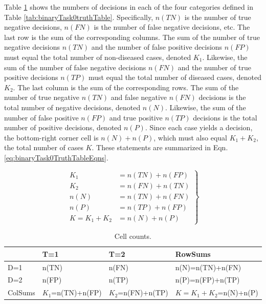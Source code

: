 \documentclass[
]{book}
\begin{document}
Table \ref{tab:binaryTask0truthTable2} shows the numbers of decisions in each of the four categories defined in Table \ref{tab:binaryTask0truthTable}. Specifically, \(n(TN)\) is the number of true negative decisions, \(n(FN)\) is the number of false negative decisions, etc. The last row is the sum of the corresponding columns. The sum of the number of true negative decisions \(n(TN)\) and the number of false positive decisions \(n(FP)\) must equal the total number of non-diseased cases, denoted \(K_1\). Likewise, the sum of the number of false negative decisions \(n(FN)\) and the number of true positive decisions \(n(TP)\) must equal the total number of diseased cases, denoted \(K_2\). The last column is the sum of the corresponding rows. The sum of the number of true negative \(n(TN)\) and false negative \(n(FN)\) decisions is the total number of negative decisions, denoted \(n(N)\). Likewise, the sum of the number of false positive \(n(FP)\) and true positive \(n(TP)\) decisions is the total number of positive decisions, denoted \(n(P)\). Since each case yields a decision, the bottom-right corner cell is \(n(N) + n(P)\), which must also equal \(K_1+K_2\), the total number of cases \(K\). These statements are summarized in Eqn. \eqref{eq:binaryTask0TruthTableEqns}.

\begin{equation} 
\left.\begin{aligned}
K_1&=n(TN)+n(FP)\\ 
K_2&=n(FN)+n(TN)\\ 
n(N)&=n(TN)+n(FN)\\ 
n(P)&=n(TP)+n(FP)\\
K=K_1+K_2&=n(N)+n(P)
\end{aligned}\right\}
\label{eq:binaryTask0TruthTableEqns}
\end{equation}

\begin{table}

\caption{\label{tab:binaryTask0truthTable2}Cell counts.}
\centering
\begin{tabular}[t]{l|l|l|l}
\hline
  & T=1 & T=2 & RowSums\\
\hline
D=1 & n(TN) & n(FN) & n(N)=n(TN)+n(FN)\\
\hline
D=2 & n(FP) & n(TP) & n(P)=n(FP)+n(TP)\\
\hline
ColSums & $K_1$=n(TN)+n(FP) & $K_2$=n(FN)+n(TP) & $K=K_1+K_2$=n(N)+n(P)\\
\hline
\end{tabular}
\end{table}
\end{document}
